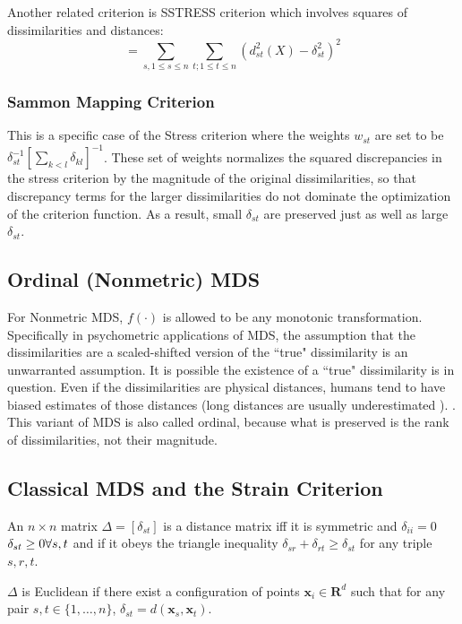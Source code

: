 \documentclass[12pt,oneside,final]{thesis}\usepackage[]{graphicx}\usepackage[]{color}
\begin{document}
Another related criterion is SSTRESS criterion which involves squares of dissimilarities and distances:
\[
=\sum_{s,1\leq s\leq n}\sum_{t;1\leq t\leq n} { \left(d_{st}^2(X)-\delta_{st}^2\right)^2  }
\]


\subsubsection{Sammon Mapping Criterion}
This is a specific case of the Stress criterion where the weights $w_{st}$ are set to be $\delta_{st}^{-1} \left[\sum_{k<l}\delta_{kl} \right]^{-1}$. These set of weights normalizes the squared discrepancies in the stress criterion by the magnitude of the original dissimilarities, so that discrepancy terms for the larger dissimilarities do not dominate the optimization of the criterion function. As a result, small $\delta_{st}$ are preserved just as well as large $\delta_{st}$.

\subsection{Ordinal (Nonmetric) MDS}
 For Nonmetric MDS, $f(\cdot)$    is allowed to be  any monotonic transformation. Specifically in psychometric applications of MDS, the assumption that the dissimilarities are a scaled-shifted version of the ``true"  dissimilarity is an unwarranted assumption. It is possible the existence of a ``true" dissimilarity is in question. Even if the dissimilarities are physical distances, humans tend to have biased estimates of those distances (long distances are usually underestimated ). \cite{Trosset1998}. This variant of MDS is also called ordinal, because what is preserved is the rank of dissimilarities, not their magnitude.

\subsection{Classical MDS and the Strain Criterion}

An $n \times n$ matrix $\Delta = \left[\delta_{st}\right]$ is a distance matrix iff it is symmetric and $\delta_{ii}=0$ $\delta_{st} \geq 0 \onespace \forall s,t$ and if it obeys the triangle inequality $\delta_{sr}+\delta_{rt} \geq \delta_{st}$ for any triple $s,r,t$.

$\Delta$ is Euclidean if there exist a configuration of points $\bm{x}_{i} \in \mathbf{R}^d$ such that for any pair $s,t \in \{1,\ldots,n\}$,    $\delta_{st}=d(\bm{x}_{s},\bm{x}_{t})$.
\end{document}
